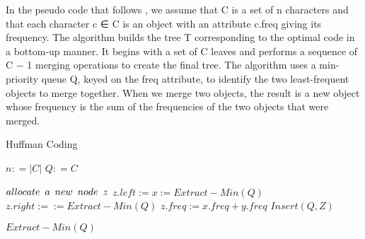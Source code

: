 \documentclass[12pt]{article}
\newcommand{\To}{\textbf{ to }}
\begin{document}
In the pseudo code that follows , we assume
that C is a set of n characters and that each character c ∈ C is an object
with an attribute c.freq giving its frequency. The algorithm builds the tree T
corresponding to the optimal code in a bottom-up manner. It begins with a set
of C leaves and performs a sequence of C − 1 merging operations to create
the final tree. The algorithm uses a min-priority queue Q, keyed on the freq
attribute, to identify the two least-frequent objects to merge together. When
we merge two objects, the result is a new object whose frequency is the sum of
the frequencies of the two objects that were merged.

\begin{algorithm}

  \caption{Huffman Coding}
  
  \begin{algorithmic}[1]
    \Statex
    
    
        \State $n: = |C|$
       \State $Q: = C$
        \For {$j \gets 1 \To n - 1$}
        
            \State$ allocate\hspace{.5em} a \hspace{.5em}new\hspace{.5em} node \hspace{.5em}z$
                \State $z.left:=x:=Extract-Min(Q)$
                \State $z.right:=:=Extract-Min(Q)$
                \State$z.freq:=x.freq +y.freq$
                \State$Insert(Q,Z)$
           
        \EndFor
        \Statex
        
        \State \Return $Extract-Min(Q)$
   
    \Statex
   
  \end{algorithmic}
  
\end{algorithm}
\end{document}
